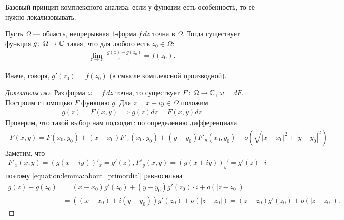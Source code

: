 \documentclass[../complex-analysis.tex]{subfiles}
\begin{document}
Базовый принцип комплексного анализа: если у функции есть особенность, то её нужно локализовывать.


\begin{lm}
	\label{lemma:about_primordial}
 Пусть $\Omega$ --- область, непрерывная $1$-форма $f\,dz$ точна в $\Omega$. Тогда существует функция $g \colon\,\Omega\to\mathbb{C}$ такая, что для любого есть $z_0 \in \Omega$:
 \begin{align*}
  \lim_{z \to z_0} \frac{g(z)-g(z_0)}{z-z_0} = f(z_0)
 .\end{align*} 

 Иначе, говоря, $g'(z_0) = f(z_0)$ (в смысле комплексной производной).
\end{lm}
\begin{proof}[\normalfont\textsc{Доказательство}]
 Раз форма $\omega = f\, dz$ точна, то существует $F \colon\, \Omega \to \mathbb{C} $, $\omega = dF$. Построим с помощью $F$ функцию $g$. Для $z = x+iy \in \Omega$ положим
 \begin{align*}
	 g(z) = F(x,y) \implies g(z)dz = F(x, y)dz 
 \end{align*} 
 Проверим, что такой выбор нам подходит: по определению дифференциала
 \begin{align}
	 \label{equation:lemma:about_primordial}
	 \ F(x,y) = F(x_0, y_0) + (x-x_0) F'_x(x_0, y_0) + (y-y_0)F'_y(x_0,y_0) + o\left(\sqrt{\left| x-x_0 \right|^2 + \left| y-y_0 \right|^2}\right)
 \end{align}
 Заметим, что 
 \begin{align*}
 		 F'_x(x, y) = (g(x + iy))'_x = g'(z), F'_y(x, y) = (g(x+iy))_y' =  g'(z) \cdot i
 \end{align*}
 поэтому \eqref{equation:lemma:about_primordial} равносильна
 \begin{align*}
	 g(z) - g(z_0) &= (x-x_0)g'(z_0) + (y-y_0)g'(z_0) \cdot i + o(\left| z-z_0 \right|) = \\
				   & = ((x-x_0) + i(y-y_0))g'(z_0) + o(\left| z-z_0 \right|) = (z-z_0)g'(z_0) + o(\left| z-z_0 \right|).
 \end{align*} 
\end{proof}
\end{document}
